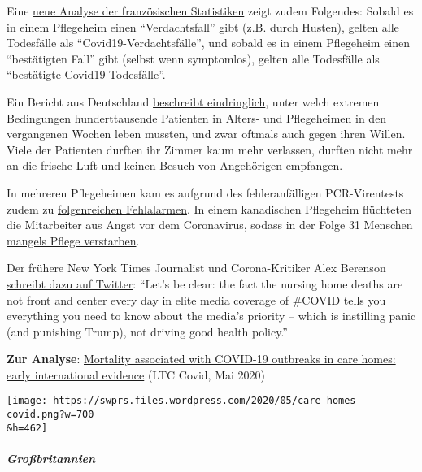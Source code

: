 Eine
\href{https://covidinfos.net/covid19/deces-dus-au-covid-19-le-nombre-officiel-de-morts-en-france-est-il-surestime/502/}{neue
Analyse der französischen Statistiken} zeigt zudem Folgendes: Sobald es
in einem Pflegeheim einen ``Verdachtsfall'' gibt (z.B. durch Husten),
gelten alle Todesfälle als ``Covid19-Verdachtsfälle'', und sobald es in
einem Pflegeheim einen ``bestätigten Fall'' gibt (selbst wenn
symptomlos), gelten alle Todesfälle als ``bestätigte
Covid19-Todesfälle''.

Ein Bericht aus Deutschland
\href{https://www.rnd.de/gesundheit/corona-ist-mir-egal-warum-helga-witt-kronshage-86-lieber-sterben-will-als-eingesperrt-zu-sein-3MEBDIOBEFA6BDULC4N5WGZJG4.html}{beschreibt
eindringlich}, unter welch extremen Bedingungen hundert­tausende
Patienten in Alters- und Pflegeheimen in den vergangenen Wochen leben
mussten, und zwar oftmals auch gegen ihren Willen. Viele der Patienten
durften ihr Zimmer kaum mehr verlassen, durften nicht mehr an die
frische Luft und keinen Besuch von Angehörigen empfangen.

In mehreren Pflegeheimen kam es aufgrund des fehleranfälligen
PCR-Virentests zudem zu
\href{https://www.wjhl.com/local-coronavirus-coverage/agape-nursing-home-says-residents-who-tested-positive-for-covid-19-were-false-positives/}{folgenreichen
Fehlalarmen}. In einem kanadischen Pflegeheim flüchteten die Mitarbeiter
aus Angst vor dem Coronavirus, sodass in der Folge 31 Menschen
\href{https://orf.at/stories/3162365/}{mangels Pflege verstarben}.

Der frühere New York Times Journalist und Corona-Kritiker Alex Berenson
\href{https://twitter.com/AlexBerenson/status/1257496834043531267}{schreibt
dazu auf Twitter}: ``Let's be clear: the fact the nursing home deaths
are not front and center every day in elite media coverage of \#COVID
tells you everything you need to know about the media's priority --
which is instilling panic (and punishing Trump), not driving good health
policy.''

\textbf{Zur Analyse}:
\href{https://ltccovid.org/2020/04/12/mortality-associated-with-covid-19-outbreaks-in-care-homes-early-international-evidence/}{Mortality
associated with COVID-19 outbreaks in care homes: early international
evidence} (LTC Covid, Mai 2020)

\texttt{[image: https://swprs.files.wordpress.com/2020/05/care-homes-covid.png?w=700\\\&h=462]}

\hypertarget{grouxdfbritannien}{%
\subparagraph{\texorpdfstring{\textbf{Großbritannien}}{Großbritannien}}\label{grouxdfbritannien}}

